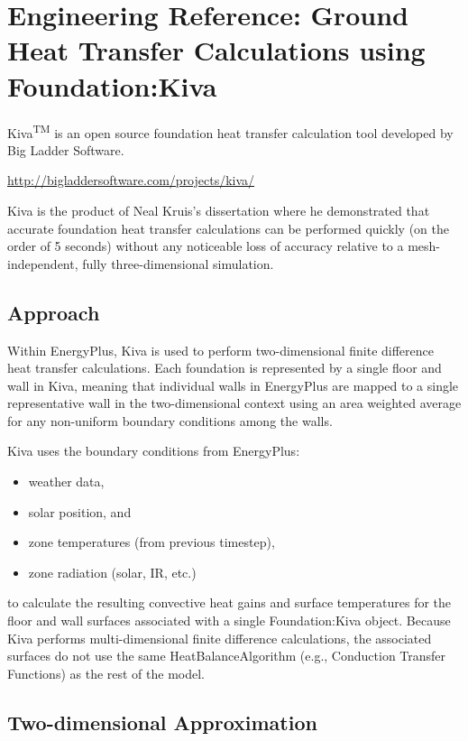 \section{Engineering Reference: Ground Heat Transfer Calculations
using
Foundation:Kiva}\label{ground-heat-transfer-calculations-using-foundationkiva}

Kiva\textsuperscript{TM} is an open source foundation heat transfer
calculation tool developed by Big Ladder Software.

\url{http://bigladdersoftware.com/projects/kiva/}

Kiva is the product of Neal Kruis's dissertation where he demonstrated
that accurate foundation heat transfer calculations can be performed
quickly (on the order of 5 seconds) without any noticeable loss of
accuracy relative to a mesh-independent, fully three-dimensional
simulation.

\subsection{Approach}\label{approach}

Within EnergyPlus, Kiva is used to perform two-dimensional finite
difference heat transfer calculations. Each foundation is represented by
a single floor and wall in Kiva, meaning that individual walls in
EnergyPlus are mapped to a single representative wall in the
two-dimensional context using an area weighted average for any
non-uniform boundary conditions among the walls.

Kiva uses the boundary conditions from EnergyPlus:

\begin{itemize}
\tightlist
\item
  weather data,
\item
  solar position, and
\item
  zone temperatures (from previous timestep),
\item
  zone radiation (solar, IR, etc.)
\end{itemize}

to calculate the resulting convective heat gains and surface
temperatures for the floor and wall surfaces associated with a single
Foundation:Kiva object. Because Kiva performs multi-dimensional finite
difference calculations, the associated surfaces do not use the same
HeatBalanceAlgorithm (e.g., Conduction Transfer Functions) as the rest
of the model.

\subsection{Two-dimensional
Approximation}\label{two-dimensional-approximation}

